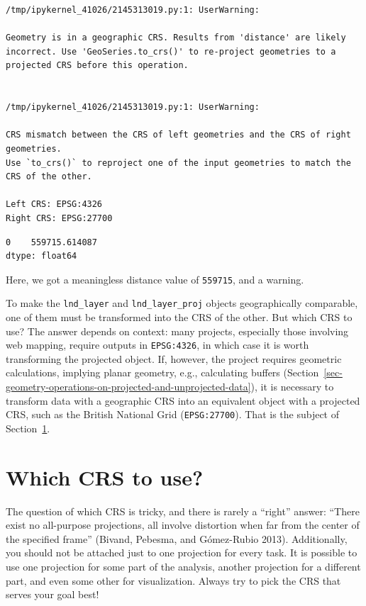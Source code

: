 \documentclass[
  letterpaper,
]{krantz}
\begin{document}
\begin{verbatim}
/tmp/ipykernel_41026/2145313019.py:1: UserWarning:

Geometry is in a geographic CRS. Results from 'distance' are likely incorrect. Use 'GeoSeries.to_crs()' to re-project geometries to a projected CRS before this operation.


/tmp/ipykernel_41026/2145313019.py:1: UserWarning:

CRS mismatch between the CRS of left geometries and the CRS of right geometries.
Use `to_crs()` to reproject one of the input geometries to match the CRS of the other.

Left CRS: EPSG:4326
Right CRS: EPSG:27700

\end{verbatim}

\begin{verbatim}
0    559715.614087
dtype: float64
\end{verbatim}

Here, we got a meaningless distance value of \texttt{559715}, and a
warning.

To make the \texttt{lnd\_layer} and \texttt{lnd\_layer\_proj} objects
geographically comparable, one of them must be transformed into the CRS
of the other. But which CRS to use? The answer depends on context: many
projects, especially those involving web mapping, require outputs in
\texttt{EPSG:4326}, in which case it is worth transforming the projected
object. If, however, the project requires geometric calculations,
implying planar geometry, e.g., calculating buffers
(Section~\ref{sec-geometry-operations-on-projected-and-unprojected-data}),
it is necessary to transform data with a geographic CRS into an
equivalent object with a projected CRS, such as the British National
Grid (\texttt{EPSG:27700}). That is the subject of
Section~\ref{sec-which-crs-to-use}.

\section{Which CRS to use?}\label{sec-which-crs-to-use}

The question of which CRS is tricky, and there is rarely a ``right''
answer: ``There exist no all-purpose projections, all involve distortion
when far from the center of the specified frame'' (Bivand, Pebesma, and
Gómez-Rubio 2013). Additionally, you should not be attached just to one
projection for every task. It is possible to use one projection for some
part of the analysis, another projection for a different part, and even
some other for visualization. Always try to pick the CRS that serves
your goal best!
\end{document}
